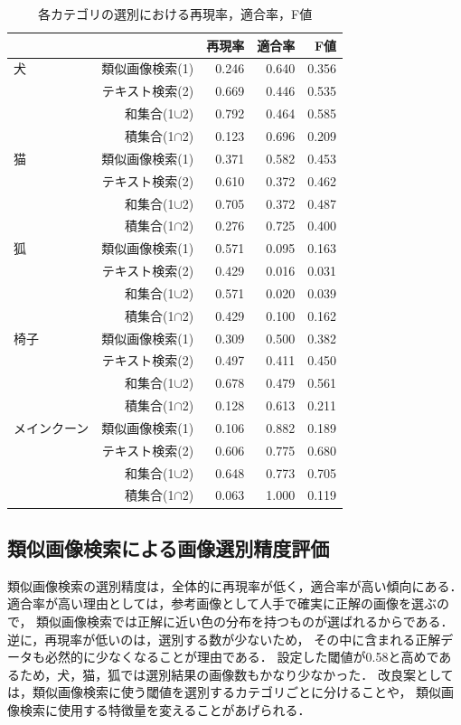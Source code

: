 \documentclass{deimj}
\begin{document}
\begin{table}[tb]
\begin{center}
\caption{各カテゴリの選別における再現率，適合率，F値}
\label{tab:result-ex}
\begin{tabular}{|l|r|r|r|r|}\hline
&& 再現率& 適合率& F値\\ \hline \hline
犬
& 類似画像検索(1)& 0.246& 0.640& 0.356 \\ \cline{2-5}
& テキスト検索(2)& 0.669& 0.446& 0.535 \\ \cline{2-5}
& 和集合(1$\cup$2)& 0.792& 0.464& 0.585 \\ \cline{2-5}
& 積集合(1$\cap$2)& 0.123& 0.696& 0.209 \\ \hline
猫
& 類似画像検索(1)& 0.371& 0.582& 0.453 \\ \cline{2-5}
& テキスト検索(2)& 0.610& 0.372& 0.462 \\ \cline{2-5}
& 和集合(1$\cup$2)& 0.705& 0.372& 0.487 \\ \cline{2-5}
& 積集合(1$\cap$2)& 0.276& 0.725& 0.400 \\ \hline
狐
& 類似画像検索(1)& 0.571& 0.095& 0.163 \\ \cline{2-5}
& テキスト検索(2)& 0.429& 0.016& 0.031 \\ \cline{2-5}
& 和集合(1$\cup$2)& 0.571& 0.020& 0.039 \\ \cline{2-5}
& 積集合(1$\cap$2)& 0.429& 0.100& 0.162 \\ \hline
椅子
& 類似画像検索(1)& 0.309& 0.500& 0.382 \\ \cline{2-5}
& テキスト検索(2)& 0.497& 0.411& 0.450 \\ \cline{2-5}
& 和集合(1$\cup$2)& 0.678& 0.479& 0.561 \\ \cline{2-5}
& 積集合(1$\cap$2)& 0.128& 0.613& 0.211 \\ \hline
メインクーン
& 類似画像検索(1)& 0.106& 0.882& 0.189 \\ \cline{2-5}
& テキスト検索(2)& 0.606& 0.775& 0.680 \\ \cline{2-5}
& 和集合(1$\cup$2)& 0.648& 0.773& 0.705 \\ \cline{2-5}
& 積集合(1$\cap$2)& 0.063& 1.000& 0.119 \\ \hline
\end{tabular}
\end{center}
\end{table}

\subsection{類似画像検索による画像選別精度評価}
類似画像検索の選別精度は，全体的に再現率が低く，適合率が高い傾向にある．
適合率が高い理由としては，参考画像として人手で確実に正解の画像を選ぶので，
類似画像検索では正解に近い色の分布を持つものが選ばれるからである．
逆に，再現率が低いのは，選別する数が少ないため，
その中に含まれる正解データも必然的に少なくなることが理由である．
設定した閾値が0.58と高めであるため，犬，猫，狐では選別結果の画像数もかなり少なかった．
改良案としては，類似画像検索に使う閾値を選別するカテゴリごとに分けることや，
類似画像検索に使用する特徴量を変えることがあげられる．
\end{document}
